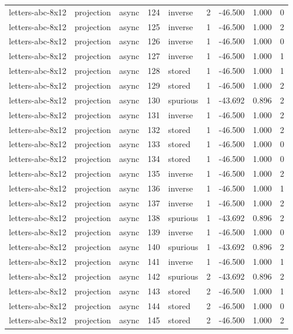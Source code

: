\begin{tabular}{lllrlrrrr}
letters-abc-8x12 & projection & async & 124 & inverse & 2 & -46.500 & 1.000 & 0 \\
letters-abc-8x12 & projection & async & 125 & inverse & 1 & -46.500 & 1.000 & 2 \\
letters-abc-8x12 & projection & async & 126 & inverse & 1 & -46.500 & 1.000 & 0 \\
letters-abc-8x12 & projection & async & 127 & inverse & 1 & -46.500 & 1.000 & 1 \\
letters-abc-8x12 & projection & async & 128 & stored & 1 & -46.500 & 1.000 & 1 \\
letters-abc-8x12 & projection & async & 129 & stored & 1 & -46.500 & 1.000 & 2 \\
letters-abc-8x12 & projection & async & 130 & spurious & 1 & -43.692 & 0.896 & 2 \\
letters-abc-8x12 & projection & async & 131 & inverse & 1 & -46.500 & 1.000 & 2 \\
letters-abc-8x12 & projection & async & 132 & stored & 1 & -46.500 & 1.000 & 2 \\
letters-abc-8x12 & projection & async & 133 & stored & 1 & -46.500 & 1.000 & 0 \\
letters-abc-8x12 & projection & async & 134 & stored & 1 & -46.500 & 1.000 & 0 \\
letters-abc-8x12 & projection & async & 135 & inverse & 1 & -46.500 & 1.000 & 2 \\
letters-abc-8x12 & projection & async & 136 & inverse & 1 & -46.500 & 1.000 & 1 \\
letters-abc-8x12 & projection & async & 137 & inverse & 1 & -46.500 & 1.000 & 2 \\
letters-abc-8x12 & projection & async & 138 & spurious & 1 & -43.692 & 0.896 & 2 \\
letters-abc-8x12 & projection & async & 139 & inverse & 1 & -46.500 & 1.000 & 0 \\
letters-abc-8x12 & projection & async & 140 & spurious & 1 & -43.692 & 0.896 & 2 \\
letters-abc-8x12 & projection & async & 141 & inverse & 1 & -46.500 & 1.000 & 1 \\
letters-abc-8x12 & projection & async & 142 & spurious & 2 & -43.692 & 0.896 & 2 \\
letters-abc-8x12 & projection & async & 143 & stored & 2 & -46.500 & 1.000 & 1 \\
letters-abc-8x12 & projection & async & 144 & stored & 2 & -46.500 & 1.000 & 0 \\
letters-abc-8x12 & projection & async & 145 & stored & 2 & -46.500 & 1.000 & 2 \\

\end{tabular}
